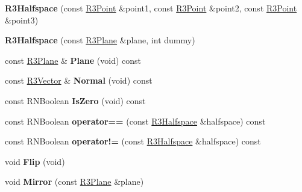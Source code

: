 \begin{DoxyCompactItemize}
\item 
{\bfseries R3\+Halfspace} (const \hyperlink{class_r3_point}{R3\+Point} \&point1, const \hyperlink{class_r3_point}{R3\+Point} \&point2, const \hyperlink{class_r3_point}{R3\+Point} \&point3)\hypertarget{class_r3_halfspace_ad2ecced924a5f3b8c2545980a850d721}{}\label{class_r3_halfspace_ad2ecced924a5f3b8c2545980a850d721}

\item 
{\bfseries R3\+Halfspace} (const \hyperlink{class_r3_plane}{R3\+Plane} \&plane, int dummy)\hypertarget{class_r3_halfspace_ae67178509b48eb289ea077a37d7067e8}{}\label{class_r3_halfspace_ae67178509b48eb289ea077a37d7067e8}

\item 
const \hyperlink{class_r3_plane}{R3\+Plane} \& {\bfseries Plane} (void) const \hypertarget{class_r3_halfspace_a5f8f10244cff9da95e26be99dd3e9d99}{}\label{class_r3_halfspace_a5f8f10244cff9da95e26be99dd3e9d99}

\item 
const \hyperlink{class_r3_vector}{R3\+Vector} \& {\bfseries Normal} (void) const \hypertarget{class_r3_halfspace_a2237d455f120f8b29dfe4ea85b644119}{}\label{class_r3_halfspace_a2237d455f120f8b29dfe4ea85b644119}

\item 
const R\+N\+Boolean {\bfseries Is\+Zero} (void) const \hypertarget{class_r3_halfspace_ae5ade0e6d2f435eca4c66ba429fa0ab1}{}\label{class_r3_halfspace_ae5ade0e6d2f435eca4c66ba429fa0ab1}

\item 
const R\+N\+Boolean {\bfseries operator==} (const \hyperlink{class_r3_halfspace}{R3\+Halfspace} \&halfspace) const \hypertarget{class_r3_halfspace_a4b4920cf217470d09874fa912a02db35}{}\label{class_r3_halfspace_a4b4920cf217470d09874fa912a02db35}

\item 
const R\+N\+Boolean {\bfseries operator!=} (const \hyperlink{class_r3_halfspace}{R3\+Halfspace} \&halfspace) const \hypertarget{class_r3_halfspace_aed093232d53939473bad4f92ad45b037}{}\label{class_r3_halfspace_aed093232d53939473bad4f92ad45b037}

\item 
void {\bfseries Flip} (void)\hypertarget{class_r3_halfspace_a3737f46f5449aa97909dcf38c4ffe84b}{}\label{class_r3_halfspace_a3737f46f5449aa97909dcf38c4ffe84b}

\item 
void {\bfseries Mirror} (const \hyperlink{class_r3_plane}{R3\+Plane} \&plane)\hypertarget{class_r3_halfspace_a83180724349a7358293d84401ce41e6d}{}\label{class_r3_halfspace_a83180724349a7358293d84401ce41e6d}


\end{DoxyCompactItemize}
